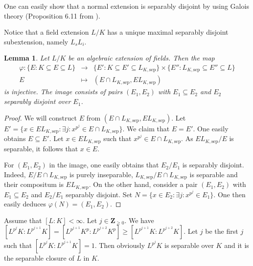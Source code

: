 \documentclass{amsart}
\theoremstyle{plain}
\newtheorem{lemma}[theorem]{Lemma}
\theoremstyle{definition}
\begin{document}
One can easily show that a normal extension is separably disjoint by using Galois theory (Proposition 6.11 from \cite{LA}). 

Notice that a field extension $L/K$ has a unique maximal separably disjoint subextension, namely $L_sL_i$.

\begin{lemma} \label{1111}
 Let $L/K$ be an algebraic extension of fields. Then the map
\begin{eqnarray*}
\varphi: \{E: K \subseteq E \subseteq L\} &\to& \{E': K \subseteq E' \subseteq L_{K,{\mathrm{sep}}}\} \times \{E'': L_{K,{\mathrm{sep}}} \subseteq E'' \subseteq
L\} \\
E &\mapsto& (E \cap L_{K,{\mathrm{sep}}}, E L_{K,{\mathrm{sep}}})
\end{eqnarray*}
is injective. The image consists of pairs $(E_1,E_2)$ with $E_1 \subseteq E_2$ and $E_2$ separably disjoint over $E_1$. 
\end{lemma}
\begin{proof}
 We will construct $E$ from $(E \cap L_{K,{\mathrm{sep}}}, E L_{K,{\mathrm{sep}}})$. Let $E'=\{x \in E L_{K,{\mathrm{sep}}}: \exists j: x^{p^j} \in E \cap
L_{K,{\mathrm{sep}}}\}$.
We claim that
$E=E'$. One easily obtains $E \subseteq E'$. Let $x \in EL_{K,{\mathrm{sep}}}$ such that $x^{p^j}
\in E \cap L_{K,{\mathrm{sep}}}$. As $E
L_{K,{\mathrm{sep}}}/E$ is separable, it follows that $x \in E$. 

For $(E_1,E_2)$ in the image, one easily obtains that $E_2/E_1$ is separably disjoint. Indeed, $E/E \cap L_{K,{\mathrm{sep}}}$ is purely inseparable,
$L_{K,{\mathrm{sep}}}/E \cap L_{K,{\mathrm{sep}}}$
is separable and their compositum is $EL_{K,{\mathrm{sep}}}$. On the other hand, consider a pair $(E_1,E_2)$ with $E_1 \subseteq E_2$ and $E_2/E_1$ separably
disjoint. Set $N=\{x \in E_2: \exists j: x^{p^j} \in E_1\}$. One then easily deduces $\varphi(N)=(E_1,E_2)$.
\end{proof}

Assume that $[L:K]<\infty$. Let $j \in {\mathbf{Z}}_{\geq 0}$. We have $[L^{p^j}K:L^{p^{j+1}}K]=[L^{p^{j+1}}K^p:L^{p^{j+2}}K^p] \geq
[L^{p^{j+1}}K:L^{p^{j+2}}K]$. Let $j$ be the first $j$ such that $[L^{p^j}K:L^{p^{j+1}}K]=1$. Then obviously $L^{p^j}K$ is separable over $K$ and it
is the separable closure of $L$ in $K$. 
\end{document}
